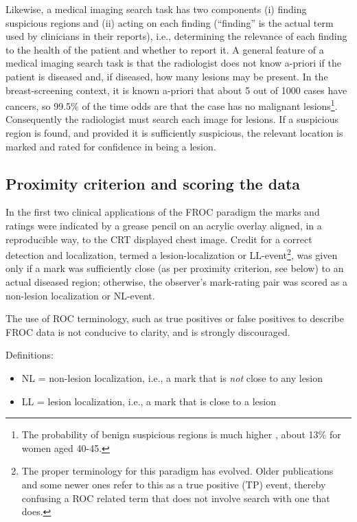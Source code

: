\documentclass[
]{book}
\providecommand{\tightlist}{%
  \setlength{\itemsep}{0pt}\setlength{\parskip}{0pt}}
\begin{document}
Likewise, a medical imaging search task has two components (i) finding suspicious regions and (ii) acting on each finding (``finding'' is the actual term used by clinicians in their reports), i.e., determining the relevance of each finding to the health of the patient and whether to report it. A general feature of a medical imaging search task is that the radiologist does not know a-priori if the patient is diseased and, if diseased, how many lesions may be present. In the breast-screening context, it is known a-priori that about 5 out of 1000 cases have cancers, so 99.5\% of the time odds are that the case has no malignant lesions\footnote{The probability of benign suspicious regions is much higher \citep{Ernster1981Epidemiology}, about 13\% for women aged 40-45.}. Consequently the radiologist must search each image for lesions. If a suspicious region is found, and provided it is sufficiently suspicious, the relevant location is marked and rated for confidence in being a lesion.

\hypertarget{froc-paradigm-scoring-the-data}{%
\subsection{Proximity criterion and scoring the data}\label{froc-paradigm-scoring-the-data}}

In the first two clinical applications of the FROC paradigm \citep{Chakraborty1986DigitalVsConv, Niklason1986SimulatedPulmonary} the marks and ratings were indicated by a grease pencil on an acrylic overlay aligned, in a reproducible way, to the CRT displayed chest image. Credit for a correct detection and localization, termed a lesion-localization or LL-event\footnote{The proper terminology for this paradigm has evolved. Older publications and some newer ones refer to this as a true positive (TP) event, thereby confusing a ROC related term that does not involve search with one that does.}, was given only if a mark was sufficiently close (as per proximity criterion, see below) to an actual diseased region; otherwise, the observer's mark-rating pair was scored as a non-lesion localization or NL-event.

The use of ROC terminology, such as true positives or false positives to describe FROC data is not conducive to clarity, and is strongly discouraged.

Definitions:

\begin{itemize}
\tightlist
\item
  NL = non-lesion localization, i.e., a mark that is \emph{not} close to any lesion
\item
  LL = lesion localization, i.e., a mark that is close to a lesion
\end{itemize}
\end{document}

